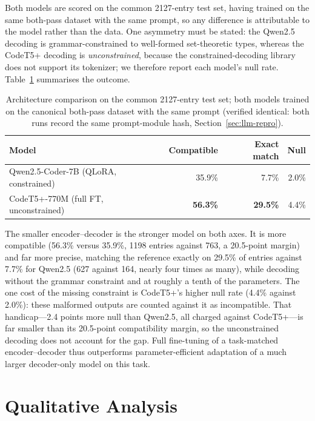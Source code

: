 Both models are scored on the common \num{2127}-entry test set, having trained on the same both-pass dataset with the same prompt, so any difference is attributable to the model rather than the data.
One asymmetry must be stated: the Qwen2.5 decoding is grammar-constrained to well-formed set-theoretic types, whereas the CodeT5+ decoding is \emph{unconstrained}, because the constrained-decoding library does not support its tokenizer; we therefore report each model's null rate.
Table~\ref{tab:llm-architecture} summarises the outcome.

\begin{table}[h]
\centering
\begin{tabular}{lrrr}
\toprule
\textbf{Model} & \textbf{Compatible} & \textbf{Exact match} & \textbf{Null} \\
\midrule
Qwen2.5-Coder-7B (QLoRA, constrained) & \num{35.9}\% & \num{7.7}\% & \num{2.0}\% \\
CodeT5+-770M (full FT, unconstrained) & \textbf{\num{56.3}\%} & \textbf{\num{29.5}\%} & \num{4.4}\% \\
\bottomrule
\end{tabular}
\caption{Architecture comparison on the common \num{2127}-entry test set; both models trained on the canonical both-pass dataset with the same prompt (verified identical: both runs record the same prompt-module hash, Section~\ref{sec:llm-repro}).}
\label{tab:llm-architecture}
\end{table}

The smaller encoder--decoder is the stronger model on both axes.
It is more compatible (\num{56.3}\% versus \num{35.9}\%, \num{1198} entries against \num{763}, a \num{20.5}-point margin) and far more precise, matching the reference exactly on \num{29.5}\% of entries against \num{7.7}\% for Qwen2.5 (\num{627} against \num{164}, nearly four times as many), while decoding without the grammar constraint and at roughly a tenth of the parameters.
The one cost of the missing constraint is CodeT5+'s higher null rate (\num{4.4}\% against \num{2.0}\%): these malformed outputs are counted against it as incompatible.
That handicap---\num{2.4} points more null than Qwen2.5, all charged against CodeT5+---is far smaller than its \num{20.5}-point compatibility margin, so the unconstrained decoding does not account for the gap.
Full fine-tuning of a task-matched encoder--decoder thus outperforms parameter-efficient adaptation of a much larger decoder-only model on this task.

\section{Qualitative Analysis}
\label{sec:llm-qualitative}
\label{sec:qualitative}

